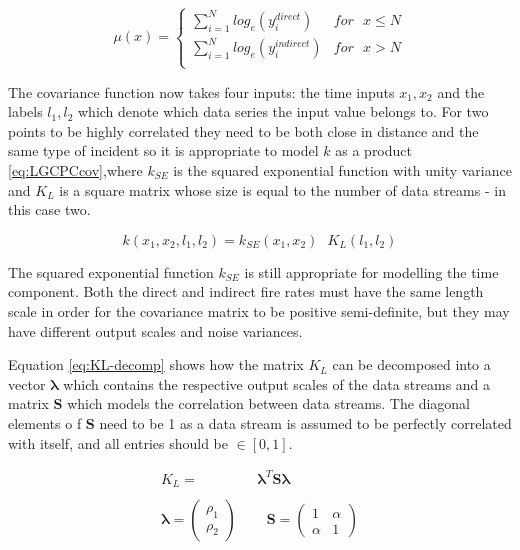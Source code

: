 \documentclass[a4paper,11pt]{report}
\begin{document}
\begin{equation} \label{eq:LGCPCmean}
\mu (x) = \begin{cases}  
\displaystyle \sum_{i=1}^{N} log_e(y_i^{direct}) & for \text{ }x\le N \\
\displaystyle \sum_{i=1}^{N}log_e(y_i^{indirect}) & for \text{ }x>N \\ \end{cases}
\end{equation}

The covariance function now takes four inputs: the time inputs \(x_1, x_2\) and the labels \(l_1,l_2\) which denote which data series the input value belongs to. For two points to be highly correlated they need to be both close in distance and the same type of incident so it is appropriate to model \(k\) as a product \ref{eq:LGCPCcov},where \(k_{SE}\) is the squared exponential function with unity variance and \(K_L\) is a square matrix whose size is equal to the number of data streams - in this case two. 

\begin{equation} \label{eq:LGCPCcov}
k(x_1,x_2,l_1,l_2) = k_{SE}(x_1,x_2) \text{ } K_L(l_1,l_2) 
\end{equation}

The squared exponential function \(k_{SE}\) is still appropriate for modelling the time component. Both the direct and indirect fire rates must have the same length scale in order for the covariance matrix to be positive semi-definite, but they may have different output scales and noise variances.

Equation \ref{eq:KL-decomp} shows how the matrix \(K_L\) can be decomposed into a vector \(\boldsymbol{\lambda}\) which contains the respective output scales of the data streams and a matrix \(\mathbf{S}\) which models the correlation between data streams. The diagonal elements o f \(\mathbf{S}\) need to be 1 as a data stream is assumed to be perfectly correlated with itself, and all entries should be \(\in [0,1]\).

\singlespacing
\begin{equation} \label{eq:KL-decomp}
\begin{aligned}
K_L =& \boldsymbol{\lambda}^T \mathbf{S} \boldsymbol{\lambda} \\ \\
\boldsymbol{\lambda} = \left( \begin{array}{cc}
\rho_1  \\
\rho_2 \end{array} \right)\text{ } & \text{ }
\mathbf{S} = \left( \begin{array}{cc}
1 & \alpha  \\
\alpha  & 1 \end{array} \right)
\end{aligned}
\end{equation}
\doublespacing
\end{document}
